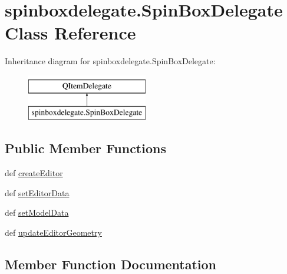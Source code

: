 \hypertarget{classspinboxdelegate_1_1SpinBoxDelegate}{}\section{spinboxdelegate.\+Spin\+Box\+Delegate Class Reference}
\label{classspinboxdelegate_1_1SpinBoxDelegate}
Inheritance diagram for spinboxdelegate.\+Spin\+Box\+Delegate\+:\begin{figure}[H]
\begin{center}
\leavevmode
\includegraphics[height=2.000000cm]{classspinboxdelegate_1_1SpinBoxDelegate}
\end{center}
\end{figure}
\subsection*{Public Member Functions}
\begin{DoxyCompactItemize}
\item 
def \hyperlink{classspinboxdelegate_1_1SpinBoxDelegate_a48f279b80136b89e3d23b3e5a944eb6c}{create\+Editor}
\item 
def \hyperlink{classspinboxdelegate_1_1SpinBoxDelegate_aebb228a11292a20dce76798c2e1cc6fd}{set\+Editor\+Data}
\item 
def \hyperlink{classspinboxdelegate_1_1SpinBoxDelegate_a56c5a68e13f55517165a774af3f4d9c6}{set\+Model\+Data}
\item 
def \hyperlink{classspinboxdelegate_1_1SpinBoxDelegate_a46186d1557b111b84b487a6c78d928aa}{update\+Editor\+Geometry}
\end{DoxyCompactItemize}


\subsection{Member Function Documentation}
\hypertarget{classspinboxdelegate_1_1SpinBoxDelegate_a48f279b80136b89e3d23b3e5a944eb6c}{}
